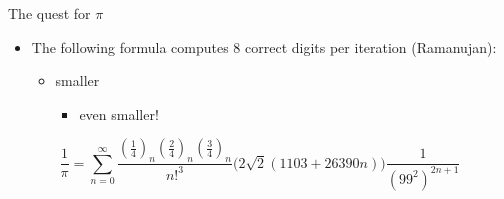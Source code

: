 \documentclass[pdf,iiufrgs-2,final,slideColor,colorBG]{prosper}
\begin{document}
\begin{slide}{The quest for $\pi$}
\begin{itemize}
\item The following formula computes $8$ correct digits per iteration 
  (Ramanujan):
	\begin{itemize}
	\item smaller
		\begin{itemize}
		\item even smaller!
		\end{itemize}
	\end{itemize}

\end{itemize}
  \begin{small}
  \begin{equation*}
    \frac{1}{\pi}=\sum_{n=0}^\infty \frac{(\frac{1}{4})_n(\frac{2}{4})_n(\frac{3}{4})_n}{n!^3}\bigl(2\sqrt{2}(1103+26390n)\bigr)\frac{1}{(99^2)^{2n+1}}
  \end{equation*}
  \end{small}
\end{slide}
\end{document}
